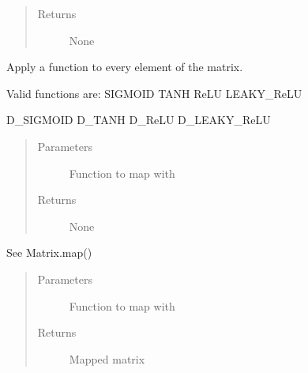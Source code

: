 \documentclass[letterpaper,10pt,english]{sphinxmanual}
\begin{document}
\begin{fulllineitems}
\begin{fulllineitems}
\begin{quote}
\begin{description}
\item[{Returns}] \leavevmode
None

\end{description}\end{quote}

\end{fulllineitems}


\begin{fulllineitems}
\label{\detokenize{libpymath.matrix:libpymath.matrix.matrix.Matrix.map}}
Apply a function to every element of the matrix.

Valid functions are:
SIGMOID
TANH
ReLU
LEAKY\_ReLU

D\_SIGMOID
D\_TANH
D\_ReLU
D\_LEAKY\_ReLU
\begin{quote}\begin{description}
\item[{Parameters}] \leavevmode
{} \textendash{} Function to map with

\item[{Returns}] \leavevmode
None

\end{description}\end{quote}

\end{fulllineitems}


\begin{fulllineitems}
\label{\detokenize{libpymath.matrix:libpymath.matrix.matrix.Matrix.mapped}}
See Matrix.map()
\begin{quote}\begin{description}
\item[{Parameters}] \leavevmode
{} \textendash{} Function to map with

\item[{Returns}] \leavevmode
Mapped matrix

\end{description}\end{quote}


\end{fulllineitems}
\end{fulllineitems}
\end{document}
